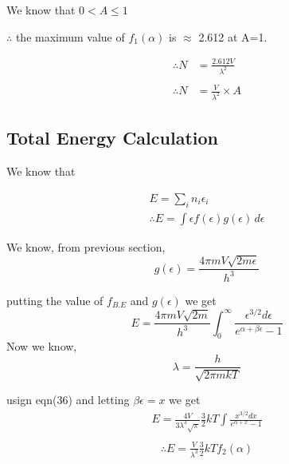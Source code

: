 \documentclass[12pt, letterpaper]{article}
\begin{document}
    We know that $0<A\leq 1$

    $\therefore$  the maximum value of $f_{1}(\alpha)$ is $\approx $ 2.612 at A=1. 

    \begin{align*}
        \therefore N &= \frac{2.612V}{\lambda^{2}} \tag*{(maximum value of A)}\\
        \\
        \therefore N &= \frac{V}{\lambda^{2}} \times A \tag*{(when A << 1)}
    \end{align*}

    \newpage
    \subsection*{Total Energy Calculation}
    We know that 

    \begin{equation}
        \begin{split}
        E =  \sum _{i} n_{i} \epsilon _{i} \\ 
        \therefore E = \int \epsilon f(\epsilon) g(\epsilon) \,d\epsilon 
        \end{split}
    \end{equation}

    We know, from previous section,
    \begin{equation}
        g(\epsilon) = \frac{4\pi m V\sqrt{2m\epsilon}}{h^{3}}
    \end{equation}

    putting the value of $f_{B.E}$  and $g(\epsilon)$ we get
    \begin{equation}
        E = \frac{4\pi m V\sqrt{2m}}{h^{3}} \int ^{\infty}_{0} \frac{\epsilon ^{3/2}d\epsilon}{e^{\alpha +  \beta \epsilon}-1}
    \end{equation}
    Now we know, 
    \begin{equation}
        \lambda = \frac{h}{\sqrt{2 \pi m k T}}
    \end{equation}

    usign eqn(36) and letting $\beta \epsilon = x$ we get 
    \begin{align*}
        E = \frac{4V}{3\lambda^{3} \sqrt{\pi}} \frac{3}{2} kT \int \frac{x^{3/2} dx}{e^{\alpha +x}-1} \\
        \end{align*}
        \begin{align}
        \therefore E = \frac{V}{\lambda^{3}} \frac{3}{2} kT f_{2}(\alpha)
    \end{align}
\end{document}
